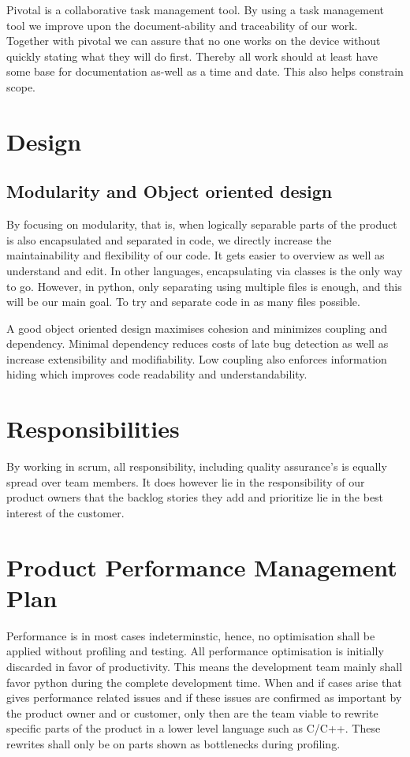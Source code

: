 \documentclass{article}
\begin{document}
Pivotal is a collaborative task management tool.
By using a task management tool we improve upon the document-ability and traceability of our work.
Together with pivotal we can assure that no one works on the device without quickly stating what they will do first.
Thereby all work should at least have some base for documentation as-well as a time and date.
This also helps constrain scope.


\section{Design}

\subsection{Modularity and Object oriented design}
By focusing on modularity, that is, when logically separable parts of the product is also encapsulated and separated in code, we directly increase the maintainability and flexibility of our code.
It gets easier to overview as well as understand and edit.
In other languages, encapsulating via classes is the only way to go.
However, in python, only separating using multiple files is enough, and this will be our main goal.
To try and separate code in as many files possible.

A good object oriented design maximises cohesion and minimizes coupling and dependency.
Minimal dependency reduces costs of late bug detection as well as increase extensibility and modifiability.
Low coupling also enforces information hiding which improves code readability and understandability.

\section{Responsibilities}
By working in scrum, all responsibility, including quality assurance's is equally spread over team members.
It does however lie in the responsibility of our product owners that the backlog stories they add and prioritize lie in the best interest of the customer.

\section{Product Performance Management Plan}
Performance is in most cases indeterminstic, hence, no optimisation shall be applied without profiling and testing. 
All performance optimisation is initially discarded in favor of productivity.
This means the development team mainly shall favor python during the complete development time.
When and if cases arise that gives performance related issues and if these issues are confirmed as important by the product owner and or customer, only then are the team viable to rewrite specific parts of the product in a lower level language such as C/C++.
These rewrites shall only be on parts shown as bottlenecks during profiling.
\end{document}
